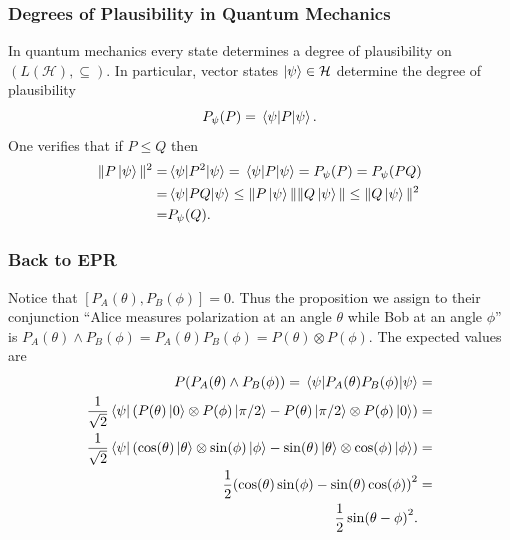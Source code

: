 \documentclass{beamer}
\begin{document}
\begin{frame}

	\frametitle{Degrees of Plausibility in Quantum Mechanics}
	
	In quantum mechanics every state determines a degree of plausibility on $(L(\mathcal{H}),\subseteq)$. In particular, vector states $\ket{\psi}\in\mathcal{H}$ determine the degree of plausibility
	\begin{equation}
		P_\psi(P)=\ev{P}{\psi}.
	\end{equation}
	One verifies that if $P\leq Q$ then
	\begin{align}
	\begin{split}
		\|P\ket{\psi}\|^2=&\ev{P^2}{\psi}=\ev{P}{\psi}=P_\psi(P)=P_\psi(PQ)\\
		=&\ev{PQ}{\psi}\leq\|P\ket{\psi}\|\|Q\ket{\psi}\|\leq\|Q\ket{\psi}\|^2\\
		=&P_\psi(Q).
	\end{split}
	\end{align}

\end{frame}

\begin{frame}

	\frametitle{Back to EPR}
	
	Notice that $[P_A(\theta),P_B(\phi)]=0$. Thus the proposition we assign to their conjunction ``Alice measures polarization at an angle $\theta$ while Bob at an angle $\phi$'' is $P_A(\theta)\wedge P_B(\phi)=P_A(\theta)P_B(\phi)=P(\theta)\otimes P(\phi)$. The expected values are
	\begin{align}
	\begin{split}
		P(P_A(\theta)\wedge P_B(\phi))=\ev{P_A(\theta)P_B(\phi)}{\psi}&=\\
		\frac{1}{\sqrt{2}}\bra{\psi}\qty(P(\theta)\ket{0}\otimes P(\phi)\ket{\pi/2}-P(\theta)\ket{\pi/2}\otimes P(\phi)\ket{0})&=\\
		\frac{1}{\sqrt{2}}\bra{\psi}\qty(\cos(\theta)\ket{\theta}\otimes \sin(\phi)\ket{\phi}-\sin(\theta)\ket{\theta}\otimes\cos(\phi)\ket{\phi})&=\\
		\frac{1}{2}\qty(\cos(\theta)\sin(\phi)-\sin(\theta)\cos(\phi))^2&=\\
		\frac{1}{2}\sin(\theta-\phi)^2.&
	\end{split}
	\end{align}

\end{frame}
\end{document}
